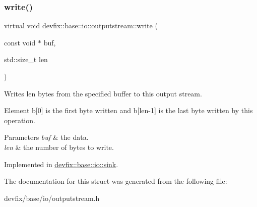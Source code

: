 \subsubsection{\texorpdfstring{write()}{write()}}
{\footnotesize\ttfamily virtual void devfix\+::base\+::io\+::outputstream\+::write (\begin{DoxyParamCaption}\item[{const void $\ast$}]{buf,  }\item[{std\+::size\+\_\+t}]{len }\end{DoxyParamCaption})\hspace{0.3cm}{\ttfamily [pure virtual]}}



Writes len bytes from the specified buffer to this output stream. 

Element b\mbox{[}0\mbox{]} is the first byte written and b\mbox{[}len-\/1\mbox{]} is the last byte written by this operation.


\begin{DoxyParams}{Parameters}
{\em buf} & the data. \\
\hline
{\em len} & the number of bytes to write. \\
\hline
\end{DoxyParams}


Implemented in \hyperlink{structdevfix_1_1base_1_1io_1_1sink_a6eade9933d316139e952b7a442f3c56d}{devfix\+::base\+::io\+::sink}.



The documentation for this struct was generated from the following file\+:\begin{DoxyCompactItemize}
\item 
devfix/base/io/outputstream.\+h\end{DoxyCompactItemize}
